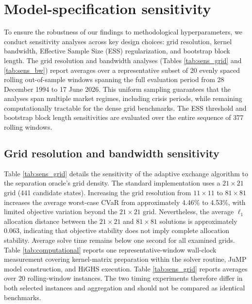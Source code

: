 \documentclass[smallextended]{svjour3}
\begin{document}
\section{Model-specification sensitivity}
\label{sec:sensitivity}
To ensure the robustness of our findings to methodological hyperparameters, we conduct sensitivity analyses across key design choices: grid resolution, kernel bandwidth, Effective Sample Size (ESS) regularization, and bootstrap block length. The grid resolution and bandwidth analyses (Tables \ref{tab:sens_grid} and \ref{tab:sens_bw}) report averages over a representative subset of 20 evenly spaced rolling out-of-sample windows spanning the full evaluation period from 28 December 1994 to 17 June 2026. This uniform sampling guarantees that the analyses span multiple market regimes, including crisis periods, while remaining computationally tractable for the dense grid benchmarks. The ESS threshold and bootstrap block length sensitivities are evaluated over the entire sequence of 377 rolling windows.

\subsection{Grid resolution and bandwidth sensitivity}
Table \ref{tab:sens_grid} details the sensitivity of the adaptive exchange algorithm to the separation oracle's grid density. The standard implementation uses a $21\times21$ grid (441 candidate states). Increasing the grid resolution from $11\times11$ to $81\times81$ increases the average worst-case CVaR from approximately 4.46\% to 4.53\%, with limited objective variation beyond the $21\times21$ grid. Nevertheless, the average $\ell_1$ allocation distance between the $21\times21$ and $81\times81$ solutions is approximately 0.063, indicating that objective stability does not imply complete allocation stability. Average solve time remains below one second for all examined grids. Table \ref{tab:computational} reports one representative-window wall-clock measurement covering kernel-matrix preparation within the solver routine, JuMP model construction, and HiGHS execution. Table \ref{tab:sens_grid} reports averages over 20 rolling-window instances. The two timing experiments therefore differ in both selected instances and aggregation and should not be compared as identical benchmarks.
\end{document}
